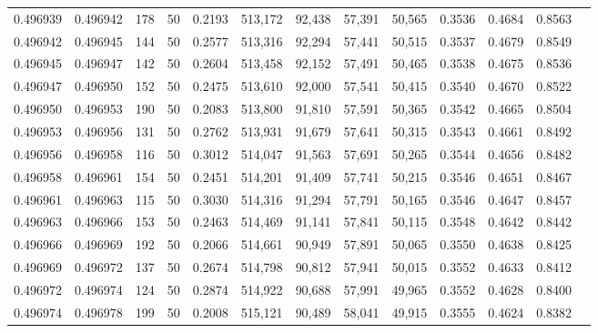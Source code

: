 \begin{tabular}{rrrrrrrrrrrrr}
0.496939 & 0.496942 &   178 &  50 &                                     0.2193 & 513,172 &  92,438 &  57,391 &  50,565 & 0.3536 & 0.4684 & 0.8563 \\
0.496942 & 0.496945 &   144 &  50 &                                     0.2577 & 513,316 &  92,294 &  57,441 &  50,515 & 0.3537 & 0.4679 & 0.8549 \\
0.496945 & 0.496947 &   142 &  50 &                                     0.2604 & 513,458 &  92,152 &  57,491 &  50,465 & 0.3538 & 0.4675 & 0.8536 \\
0.496947 & 0.496950 &   152 &  50 &                                     0.2475 & 513,610 &  92,000 &  57,541 &  50,415 & 0.3540 & 0.4670 & 0.8522 \\
0.496950 & 0.496953 &   190 &  50 &                                     0.2083 & 513,800 &  91,810 &  57,591 &  50,365 & 0.3542 & 0.4665 & 0.8504 \\
0.496953 & 0.496956 &   131 &  50 &                                     0.2762 & 513,931 &  91,679 &  57,641 &  50,315 & 0.3543 & 0.4661 & 0.8492 \\
0.496956 & 0.496958 &   116 &  50 &                                     0.3012 & 514,047 &  91,563 &  57,691 &  50,265 & 0.3544 & 0.4656 & 0.8482 \\
0.496958 & 0.496961 &   154 &  50 &                                     0.2451 & 514,201 &  91,409 &  57,741 &  50,215 & 0.3546 & 0.4651 & 0.8467 \\
0.496961 & 0.496963 &   115 &  50 &                                     0.3030 & 514,316 &  91,294 &  57,791 &  50,165 & 0.3546 & 0.4647 & 0.8457 \\
0.496963 & 0.496966 &   153 &  50 &                                     0.2463 & 514,469 &  91,141 &  57,841 &  50,115 & 0.3548 & 0.4642 & 0.8442 \\
0.496966 & 0.496969 &   192 &  50 &                                     0.2066 & 514,661 &  90,949 &  57,891 &  50,065 & 0.3550 & 0.4638 & 0.8425 \\
0.496969 & 0.496972 &   137 &  50 &                                     0.2674 & 514,798 &  90,812 &  57,941 &  50,015 & 0.3552 & 0.4633 & 0.8412 \\
0.496972 & 0.496974 &   124 &  50 &                                     0.2874 & 514,922 &  90,688 &  57,991 &  49,965 & 0.3552 & 0.4628 & 0.8400 \\
0.496974 & 0.496978 &   199 &  50 &                                     0.2008 & 515,121 &  90,489 &  58,041 &  49,915 & 0.3555 & 0.4624 & 0.8382 \\

\end{tabular}
